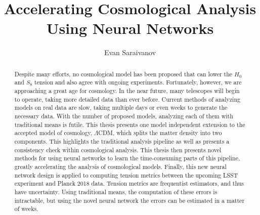 \documentclass[master,bottom,nosig]{usbthesis}
\author{Evan Saraivanov}%
\title{Accelerating Cosmological Analysis Using Neural Networks}%
\theoremstyle{definition}
\theoremstyle{plain} %
\begin{document}
\singlespacing %
\maketitle %
\makeapproval %

\begin{abstract}
Despite many efforts, no cosmological model has been proposed that can lower the $H_0$ and $S_8$ tension and also agree with ongoing experiments. Fortunately, however, we are approaching a great age for cosmology. In the near future, many telescopes will begin to operate, taking more detailed data than ever before. Current methods of analyzing models on real data are slow, taking multiple days or even weeks to generate the necessary data. With the number of proposed models, analyzing each of them with traditional means is futile. This thesis presents one model independent extension to the accepted model of cosmology, $\Lambda$CDM, which splits the matter density into two components. This highlights the traditional analysis pipeline as well as presents a consistency check within cosmological analysis. This thesis then presents novel methods for using neural networks to learn the time-consuming parts of this pipeline, greatly accelerating the analysis of cosmological models. Finally, this new neural network design is applied to computing tension metrics between the upcoming LSST experiment and Planck 2018 data. Tension metrics are frequentist estimators, and thus have uncertainty. Using traditional means, the computation of these errors is intractable, but using the novel neural network the errors can be estimated in a matter of weeks.
\end{abstract}
\tableofcontents %
\listoffigures %
%
%
\end{document}
